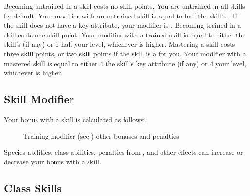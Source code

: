         \begin{itemize}
             Becoming untrained in a skill costs no skill points.
                You are untrained in all skills by default.
                Your modifier with an untrained skill is equal to half the skill's .
                If the skill does not have a key attribute, your modifier is .
             Becoming trained in a skill costs one skill point.
                Your modifier with a trained skill is equal to either the skill's  (if any) or 1 \add half your level, whichever is higher.
             Mastering a skill costs three skill points, or two skill points if the skill is a  for you.
                Your modifier with a mastered skill is equal to either 4 \add the skill's key attribute (if any) or 4 \add your level, whichever is higher.
        \end{itemize}

    \subsection{Skill Modifier}\label{Skill Modifier}

        Your bonus with a skill is calculated as follows:

        \begin{figure}[h]
            \centering Training modifier (see ) \add other bonuses and penalties
        \end{figure}

         Species abilities, class abilities, penalties from , and other effects can increase or decrease your bonus with a skill.

    \subsection{Class Skills}

